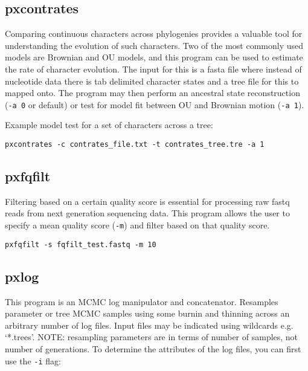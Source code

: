 \documentclass[12pt,letterpaper]{memoir}
\begin{document}
\subsection{pxcontrates}

Comparing continuous characters across phylogenies provides a valuable tool for understanding the evolution of such characters. Two of the most commonly used models are Brownian and OU models, and this program can be used to estimate the rate of character evolution. The input for this is a fasta file where instead of nucleotide data there is tab delimited character states and a tree file for this to mapped onto. The program may then perform an ancestral state reconstruction (\texttt{-a 0} or default) or test for model fit between OU and Brownian motion (\texttt{-a 1}).

\begin{flushleft}
Example model test for a set of characters across a tree:
\begin{verbatim}
pxcontrates -c contrates_file.txt -t contrates_tree.tre -a 1
\end{verbatim}
\end{flushleft}

\subsection{pxfqfilt}

Filtering based on a certain quality score is essential for processing raw fastq reads from next generation sequencing data. This program allows the user to specify a mean quality score (\texttt{-m}) and filter based on that quality score.

\begin{flushleft}
\begin{verbatim}
pxfqfilt -s fqfilt_test.fastq -m 10
\end{verbatim}
\end{flushleft}

\subsection{pxlog}

This program is an MCMC log manipulator and concatenator. Resamples parameter or tree MCMC samples using some burnin and thinning across an arbitrary number of log files. Input files may be indicated using wildcards e.g. `*.trees'. NOTE: resampling parameters are in terms of number of samples, not number of generations. To determine the attributes of the log files, you can first use the \texttt{-i} flag:
\end{document}
